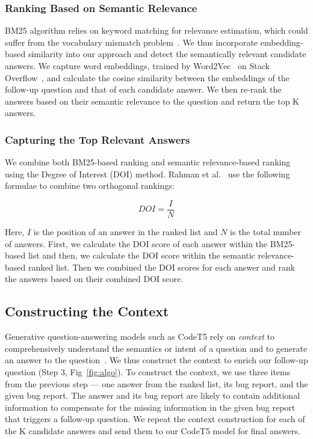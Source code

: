 \subsubsection{Ranking Based on Semantic Relevance}
BM25 algorithm relies on keyword matching for relevance estimation, which could suffer from the vocabulary mismatch problem~\cite{furnas1987vocabulary}. We thus incorporate embedding-based similarity into our approach and detect the semantically relevant candidate answers. We capture word embeddings, trained by Word2Vec~\cite{church2017word2vec} on Stack Overflow~\cite{efstathiou2018word}, and calculate the cosine similarity between the embeddings of the follow-up question and that of each candidate answer. We then re-rank the answers based on their semantic relevance to the question and return the top K answers.\par

\subsubsection{Capturing the Top Relevant Answers}
We combine both BM25-based ranking and semantic relevance-based ranking using the Degree of Interest (DOI) method. Rahman et al.~\cite{rahman2016rack} use the following formulae to combine two orthogonal rankings:\par

\begin{equation}
DOI = \frac{I}{N} 
\end{equation}

Here, $I$ is the position of an answer in the ranked list and $N$ is the total number of answers. First, we calculate the DOI score of each answer within the BM25-based list and then, we calculate the DOI score within the semantic relevance-based ranked list. Then we combined the DOI scores for each answer and rank the answers based on their combined DOI score.\par

\subsection{Constructing the Context}
Generative question-answering models such as CodeT5 rely on \textit{context} to comprehensively understand the semantics or intent of a question and to generate an answer to the question~\cite{huggingfacegenerativeqa,seonwoo2020context}. We thus construct the context to enrich our follow-up question (Step 3, Fig~\ref{fig:algo}).
To construct the context, we use three items from the previous step --- one answer from the ranked list, its bug report, and the given bug report. The answer and its bug report are likely to contain additional information to compensate for the missing information in the given bug report that triggers a follow-up question. We repeat the context construction for each of the K candidate answers and send them to our CodeT5 model for final answers.\par 

